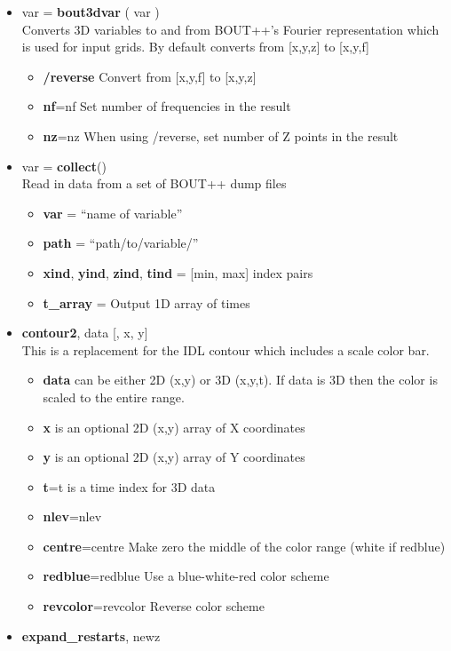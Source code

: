 \documentclass[12pt]{article}
\begin{document}
\begin{itemize}
\item var = {\bf bout3dvar} ( var ) \\
  Converts 3D variables to and from BOUT++'s Fourier representation
  which is used for input grids. By default converts from [x,y,z] to [x,y,f]
  \begin{itemize}
  \item {\bf /reverse}  Convert from [x,y,f] to [x,y,z]
  \item {\bf nf}=nf Set number of frequencies in the result
  \item {\bf nz}=nz When using /reverse, set number of Z points in the result
  \end{itemize}
\item var = {\bf collect}() \\
  Read in data from a set of BOUT++ dump files
  \begin{itemize}
    \item {\bf var} = ``name of variable''
    \item {\bf path} = ``path/to/variable/''
    \item {\bf xind}, {\bf yind}, {\bf zind}, {\bf tind}  = [min, max] index pairs
    \item {\bf t\_array} = Output 1D array of times
  \end{itemize}
\item {\bf contour2}, data [, x, y] \\
  This is a replacement for the IDL contour which includes
  a scale color bar.
  \begin{itemize}
  \item {\bf data} can be either 2D (x,y) or 3D (x,y,t). If data
    is 3D then the color is scaled to the entire range.
  \item {\bf x} is an optional 2D (x,y) array of X coordinates
  \item {\bf y} is an optional 2D (x,y) array of Y coordinates
  \item {\bf t}=t is a time index for 3D data
  \item {\bf nlev}=nlev
  \item {\bf centre}=centre  Make zero the middle of the color
    range (white if redblue)
  \item {\bf redblue}=redblue  Use a blue-white-red color scheme
  \item {\bf revcolor}=revcolor  Reverse color scheme
  \end{itemize}
\item {\bf expand\_restarts}, newz \\

\end{itemize}
\end{document}
